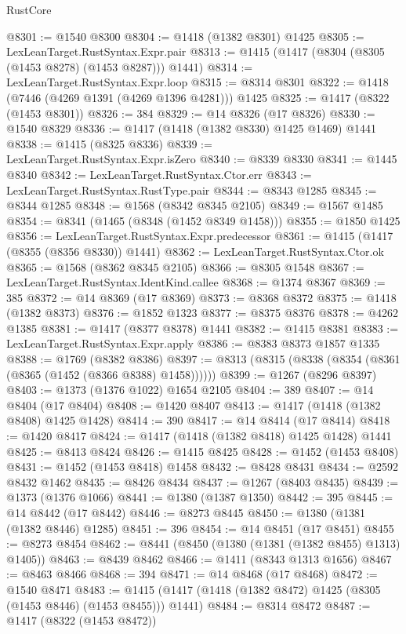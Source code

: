 \begin{lexlean}{RustCore}
\begin{coremodule}
@8301 := @1540 @8300
@8304 := @1418 (@1382 @8301) @1425
@8305 := LexLeanTarget.RustSyntax.Expr.pair
@8313 := @1415 (@1417 (@8304 (@8305 (@1453 @8278) (@1453 @8287))) @1441)
@8314 := LexLeanTarget.RustSyntax.Expr.loop
@8315 := @8314 @8301
@8322 := @1418 (@7446 (@4269 @1391 (@4269 @1396 @4281))) @1425
@8325 := @1417 (@8322 (@1453 @8301))
@8326 := 384
@8329 := @14 @8326 (@17 @8326)
@8330 := @1540 @8329
@8336 := @1417 (@1418 (@1382 @8330) @1425 @1469) @1441
@8338 := @1415 (@8325 @8336)
@8339 := LexLeanTarget.RustSyntax.Expr.isZero
@8340 := @8339 @8330
@8341 := @1445 @8340
@8342 := LexLeanTarget.RustSyntax.Ctor.err
@8343 := LexLeanTarget.RustSyntax.RustType.pair
@8344 := @8343 @1285
@8345 := @8344 @1285
@8348 := @1568 (@8342 @8345 @2105)
@8349 := @1567 @1485
@8354 := @8341 (@1465 (@8348 (@1452 @8349 @1458)))
@8355 := @1850 @1425
@8356 := LexLeanTarget.RustSyntax.Expr.predecessor
@8361 := @1415 (@1417 (@8355 (@8356 @8330)) @1441)
@8362 := LexLeanTarget.RustSyntax.Ctor.ok
@8365 := @1568 (@8362 @8345 @2105)
@8366 := @8305 @1548
@8367 := LexLeanTarget.RustSyntax.IdentKind.callee
@8368 := @1374 @8367
@8369 := 385
@8372 := @14 @8369 (@17 @8369)
@8373 := @8368 @8372
@8375 := @1418 (@1382 @8373)
@8376 := @1852 @1323
@8377 := @8375 @8376
@8378 := @4262 @1385
@8381 := @1417 (@8377 @8378) @1441
@8382 := @1415 @8381
@8383 := LexLeanTarget.RustSyntax.Expr.apply
@8386 := @8383 @8373 @1857 @1335
@8388 := @1769 (@8382 @8386)
@8397 := @8313 (@8315 (@8338 (@8354 (@8361 (@8365 (@1452 (@8366 @8388) @1458))))))
@8399 := @1267 (@8296 @8397)
@8403 := @1373 (@1376 @1022) @1654 @2105
@8404 := 389
@8407 := @14 @8404 (@17 @8404)
@8408 := @1420 @8407
@8413 := @1417 (@1418 (@1382 @8408) @1425 @1428)
@8414 := 390
@8417 := @14 @8414 (@17 @8414)
@8418 := @1420 @8417
@8424 := @1417 (@1418 (@1382 @8418) @1425 @1428) @1441
@8425 := @8413 @8424
@8426 := @1415 @8425
@8428 := @1452 (@1453 @8408)
@8431 := @1452 (@1453 @8418) @1458
@8432 := @8428 @8431
@8434 := @2592 @8432 @1462
@8435 := @8426 @8434
@8437 := @1267 (@8403 @8435)
@8439 := @1373 (@1376 @1066)
@8441 := @1380 (@1387 @1350)
@8442 := 395
@8445 := @14 @8442 (@17 @8442)
@8446 := @8273 @8445
@8450 := @1380 (@1381 (@1382 @8446) @1285)
@8451 := 396
@8454 := @14 @8451 (@17 @8451)
@8455 := @8273 @8454
@8462 := @8441 (@8450 (@1380 (@1381 (@1382 @8455) @1313) @1405))
@8463 := @8439 @8462
@8466 := @1411 (@8343 @1313 @1656)
@8467 := @8463 @8466
@8468 := 394
@8471 := @14 @8468 (@17 @8468)
@8472 := @1540 @8471
@8483 := @1415 (@1417 (@1418 (@1382 @8472) @1425 (@8305 (@1453 @8446) (@1453 @8455))) @1441)
@8484 := @8314 @8472
@8487 := @1417 (@8322 (@1453 @8472))

\end{coremodule}
\end{lexlean}
